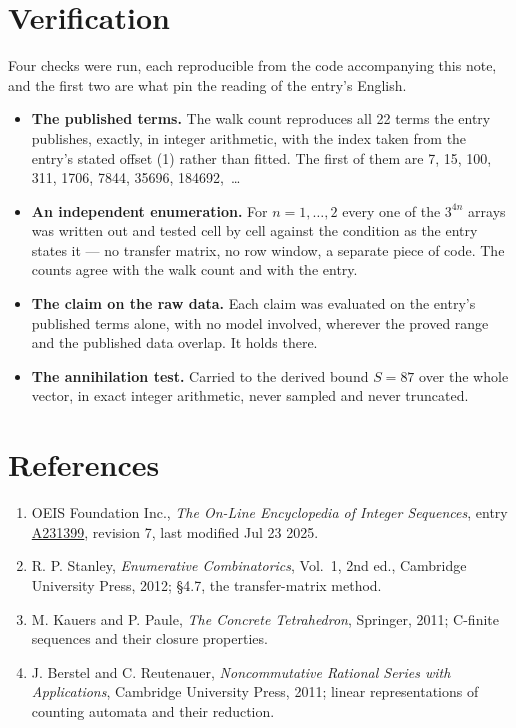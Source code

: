 \documentclass[11pt]{article}
\theoremstyle{definition}
\begin{document}
\section{Verification}

Four checks were run, each reproducible from the code accompanying this note, and the first two are what pin the reading of the entry's English.

\begin{itemize}

\item {\bfseries The published terms.} The walk count reproduces all 22 terms the entry publishes, exactly, in integer arithmetic, with the index taken from the entry's stated offset (1) rather than fitted. The first of them are 7, 15, 100, 311, 1706, 7844, 35696, 184692,~\dots

\item {\bfseries An independent enumeration.} For $n = 1,\dots,2$ every one of the $3^{4n}$ arrays was written out and tested cell by cell against the condition as the entry states it --- no transfer matrix, no row window, a separate piece of code. The counts agree with the walk count and with the entry.

\item {\bfseries The claim on the raw data.} Each claim was evaluated on the entry's published terms alone, with no model involved, wherever the proved range and the published data overlap. It holds there.

\item {\bfseries The annihilation test.} Carried to the derived bound $S = 87$ over the whole vector, in exact integer arithmetic, never sampled and never truncated.

\end{itemize}

\section{References}

\begin{enumerate}

\item OEIS Foundation Inc., \emph{The On-Line Encyclopedia of Integer Sequences}, entry \href{https://oeis.org/A231399}{A231399}, revision 7, last modified Jul 23 2025.

\item R. P. Stanley, \emph{Enumerative Combinatorics}, Vol.~1, 2nd ed., Cambridge University Press, 2012; \S4.7, the transfer-matrix method.

\item M. Kauers and P. Paule, \emph{The Concrete Tetrahedron}, Springer, 2011; C-finite sequences and their closure properties.

\item J. Berstel and C. Reutenauer, \emph{Noncommutative Rational Series with Applications}, Cambridge University Press, 2011; linear representations of counting automata and their reduction.

\end{enumerate}
\end{document}
